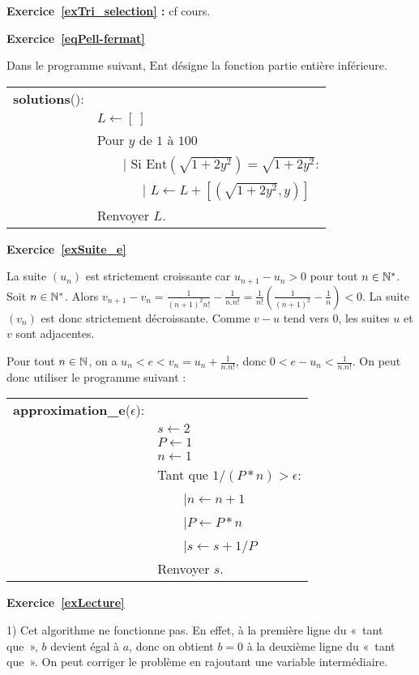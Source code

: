 \documentclass[11pt,a4paper]{article}
\begin{document}
\textbf{Exercice~\ref{exTri_selection} : }cf cours.


\textbf{Exercice~\ref{eqPell-fermat}}

Dans le programme suivant, $\mathrm{Ent}$ désigne la fonction partie entière inférieure. 

\begin{tabular}{ll}
\textbf{solutions}():\\
&$L\leftarrow [\ ]$\\
& Pour $y$ de $1$ à $100$\\
& \ \ \ {\ \rm |} Si $\mathrm{Ent}(\sqrt{1+2y^2})=\sqrt{1+2y^2}$:\\
& \ \ \ \ \ \ {\ \rm |} $L\leftarrow L+[(\sqrt{1+2y^2},y)]$\\
& Renvoyer $L$.\\
\end{tabular}


\textbf{Exercice~\ref{exSuite_e}}

La suite $(u_n)$ est strictement croissante car $u_{n+1}-u_n>0$ pour tout $n\in \mathbb{N}^*$. Soit $n\in \mathbb{N}^*$. Alors $v_{n+1}-v_n=\frac{1}{(n+1)^2 n!}-\frac{1}{n.n!}=\frac{1}{n!}(\frac{1}{(n+1)^2}-\frac{1}{n})<0$. La suite $(v_n)$ est donc strictement décroissante. Comme $v-u$ tend vers $0$, les suites $u$ et $v$ sont adjacentes.


Pour tout $n\in \mathbb{N}$, on a $u_n< e <v_n=u_n+\frac{1}{n.n!}$, donc $0<e-u_n<\frac{1}{n.n!}$. On peut donc utiliser le programme suivant :


\begin{tabular}{ll}
\textbf{approximation\_e}($\epsilon$):\\
& $s\leftarrow 2$\\
& $P\leftarrow 1$\\
& $n\leftarrow 1$\\
& Tant que $1/(P*n)>\epsilon$:\\
& \ \ \ {\ \rm |}$n\leftarrow n+1$\\
& \ \ \ {\ \rm |}$P\leftarrow P*n$\\
& \ \ \ {\ \rm |}$s\leftarrow s+1/P$\\
& Renvoyer $s$. 
\end{tabular}



\textbf{Exercice~\ref{exLecture}}

1) Cet algorithme ne fonctionne pas. En effet, à la première ligne du «~tant que~», $b$ devient égal à $a$, donc on obtient $b=0$ à la deuxième ligne du «~tant que~». On peut corriger le problème en rajoutant une variable intermédiaire. 
\end{document}
